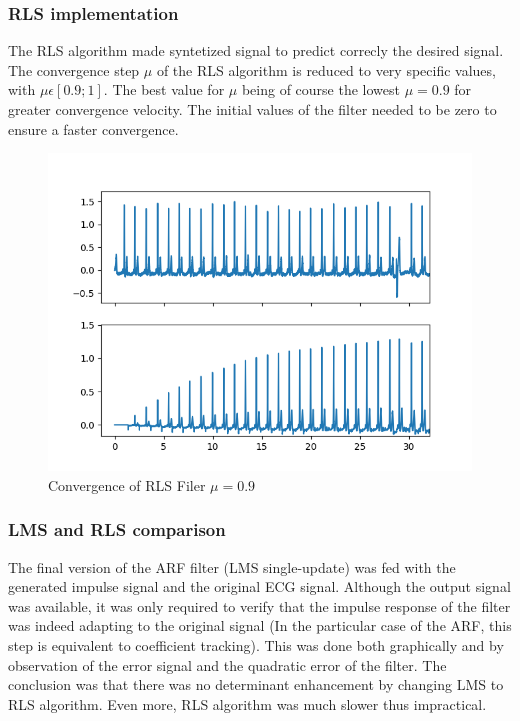 \documentclass[conference]{IEEEtran}
\begin{document}
\subsubsection{RLS implementation}
The RLS algorithm made syntetized signal to predict correcly the desired signal.
The convergence step $\mu$ of the RLS algorithm is reduced to very specific values, with $\mu \epsilon [0.9; 1]$. The best value for $\mu$ being of course the lowest $\mu = 0.9$ for greater convergence velocity. The initial values of the filter needed to be zero to ensure a faster convergence. 
\begin{figure}[H]
\centerline{\includegraphics[scale=0.6]{imagenes/RLS_filter.png}}
\caption{Convergence of RLS Filer $\mu=0.9$}
\label{fig}
\end{figure}

\subsubsection{LMS and RLS comparison} 

The final version of the ARF filter (LMS single-update) was fed with the generated impulse signal and the original ECG signal. Although the output signal was available, it was only required to verify that the impulse response of the filter was indeed adapting to the original signal (In the particular case of the ARF, this step is equivalent to coefficient tracking). This was done both graphically and by observation of the error signal and the quadratic error of the filter. The conclusion was that there was no determinant enhancement by changing LMS to RLS algorithm. Even more, RLS algorithm was much slower thus impractical. \par
\end{document}
